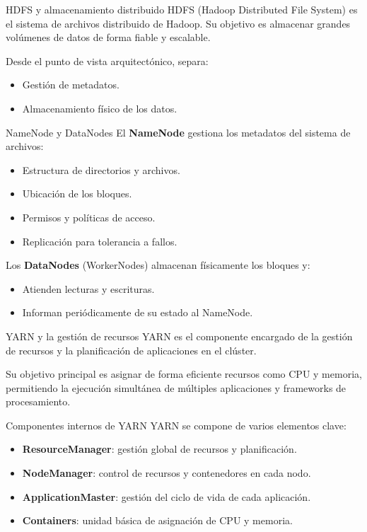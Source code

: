 \documentclass{beamer}
\begin{document}
\begin{frame}{HDFS y almacenamiento distribuido}
HDFS (Hadoop Distributed File System) es el sistema de archivos distribuido de Hadoop. Su objetivo es almacenar grandes volúmenes de datos de forma fiable y escalable.

Desde el punto de vista arquitectónico, separa:
\begin{itemize}
    \item Gestión de metadatos.
    \item Almacenamiento físico de los datos.
\end{itemize}
\end{frame}

\begin{frame}{NameNode y DataNodes}
El \textbf{NameNode} gestiona los metadatos del sistema de archivos:
\begin{itemize}
    \item Estructura de directorios y archivos.
    \item Ubicación de los bloques.
    \item Permisos y políticas de acceso.
    \item Replicación para tolerancia a fallos.
\end{itemize}

Los \textbf{DataNodes} (WorkerNodes) almacenan físicamente los bloques y:
\begin{itemize}
    \item Atienden lecturas y escrituras.
    \item Informan periódicamente de su estado al NameNode.
\end{itemize}
\end{frame}

\begin{frame}{YARN y la gestión de recursos}
YARN es el componente encargado de la gestión de recursos y la planificación de aplicaciones en el clúster.

Su objetivo principal es asignar de forma eficiente recursos como CPU y memoria, permitiendo la ejecución simultánea de múltiples aplicaciones y frameworks de procesamiento.
\end{frame}

\begin{frame}{Componentes internos de YARN}
YARN se compone de varios elementos clave:
\begin{itemize}
    \item \textbf{ResourceManager}: gestión global de recursos y planificación.
    \item \textbf{NodeManager}: control de recursos y contenedores en cada nodo.
    \item \textbf{ApplicationMaster}: gestión del ciclo de vida de cada aplicación.
    \item \textbf{Containers}: unidad básica de asignación de CPU y memoria.
\end{itemize}
\end{frame}
\end{document}
